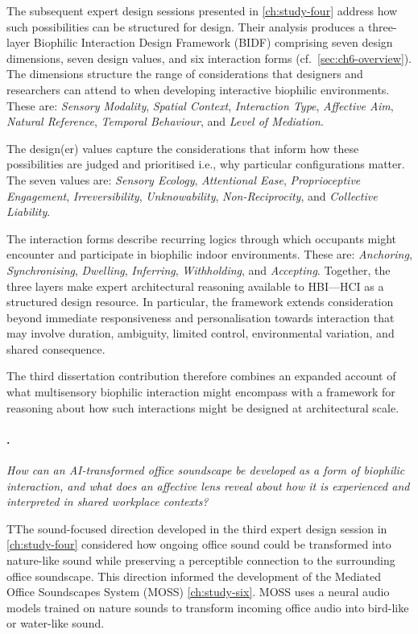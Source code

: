 The subsequent expert design sessions presented in \autoref{ch:study-four} address how such possibilities can be structured for design. Their analysis produces a three-layer Biophilic Interaction Design Framework (BIDF) comprising seven design dimensions, seven design values, and six interaction forms (cf.~\autoref{sec:ch6-overview}). The dimensions structure the range of considerations that designers and researchers can attend to when developing interactive biophilic environments. These are: \textit{Sensory Modality}, \textit{Spatial Context}, \textit{Interaction Type}, \textit{Affective Aim}, \textit{Natural Reference}, \textit{Temporal Behaviour}, and \textit{Level of Mediation}. 

The design(er) values capture the considerations that inform how these possibilities are judged and prioritised i.e., why particular configurations matter. The seven values are: \textit{Sensory Ecology}, \textit{Attentional Ease}, \textit{Proprioceptive Engagement}, \textit{Irreversibility}, \textit{Unknowability}, \textit{Non-Reciprocity}, and \textit{Collective Liability}.
 
The interaction forms describe recurring logics through which occupants might encounter and participate in biophilic indoor environments. These are: \textit{Anchoring}, \textit{Synchronising}, \textit{Dwelling}, \textit{Inferring}, \textit{Withholding}, and \textit{Accepting}. Together, the three layers make expert architectural reasoning available
to HBI---HCI as a structured design resource. In particular, the framework extends consideration beyond immediate responsiveness and personalisation towards interaction that may involve duration, ambiguity, limited control, environmental variation, and shared consequence.

The third dissertation contribution therefore combines an expanded
account of what multisensory biophilic interaction might encompass with
a framework for reasoning about how such interactions might be designed
at architectural scale.
\clearpage
\paragraph{.}

\emph{How can an AI-transformed office soundscape be developed as a form
of biophilic interaction, and what does an affective lens reveal about
how it is experienced and interpreted in shared workplace contexts?}

TThe sound-focused direction developed in the third expert design session
in \autoref{ch:study-four} considered how ongoing office sound could be
transformed into nature-like sound while preserving a perceptible
connection to the surrounding office soundscape. This direction informed
the development of the Mediated Office Soundscapes System (MOSS) \autoref{ch:study-six}. MOSS uses a neural audio models
trained on nature sounds to transform incoming office audio into bird-like or water-like sound. 

